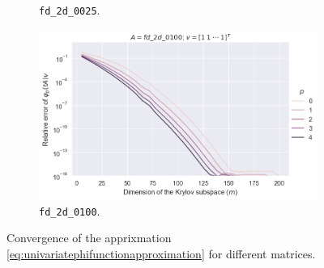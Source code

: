 \begin{figure}[h!]
\begin{subfigure}[b]{0.45\textwidth}
        \caption{\texttt{fd\_2d\_0025}.}
    \end{subfigure}
    \hfill
    \begin{subfigure}[b]{0.45\textwidth}
        \includegraphics[width=\textwidth]{img/krylovunivariate/fd_2d_0100.png}
        \caption{\texttt{fd\_2d\_0100}.}
    \end{subfigure}

    \caption{Convergence of the apprixmation \eqref{eq:univariatephifunctionapproximation} for different matrices.}
    \label{fig:krylovmethodunivariateevaluation}
\end{figure}


